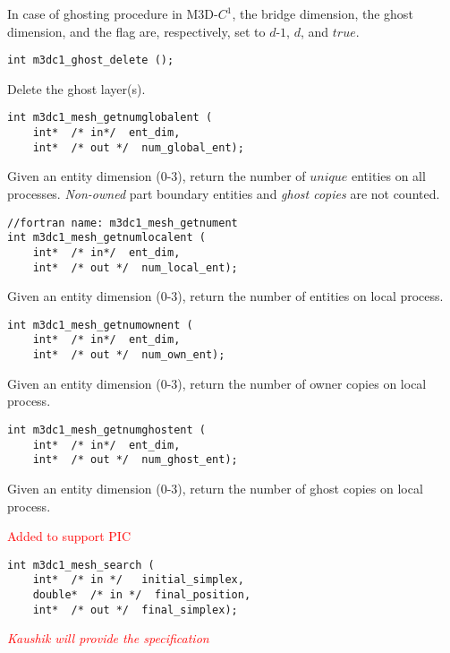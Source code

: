 In case of ghosting procedure in M3D-$C^1$, the bridge dimension, the ghost dimension, and the flag are, respectively, set to $d$-$1$, $d$, and $true$.

\begin{verbatim}
int m3dc1_ghost_delete ();
\end{verbatim}\vspace{-.5cm}\hspace{1cm}
Delete the ghost layer(s).

\begin{verbatim}
int m3dc1_mesh_getnumglobalent (
    int*  /* in*/  ent_dim, 
    int*  /* out */  num_global_ent);
\end{verbatim}\vspace{-.5cm}\hspace{1cm}
Given an entity dimension (0-3), return the number of $unique$ entities on all processes. \textit{Non-owned} part boundary entities and \textit{ghost copies} are not counted.

\begin{verbatim}
//fortran name: m3dc1_mesh_getnument
int m3dc1_mesh_getnumlocalent (
    int*  /* in*/  ent_dim, 
    int*  /* out */  num_local_ent);
\end{verbatim}\vspace{-.5cm}\hspace{1cm}
Given an entity dimension (0-3), return the number of entities on local process. 

\begin{verbatim}
int m3dc1_mesh_getnumownent (
    int*  /* in*/  ent_dim, 
    int*  /* out */  num_own_ent);
\end{verbatim}\vspace{-.5cm}\hspace{1cm}
Given an entity dimension (0-3), return the number of owner copies on local process.

\begin{verbatim}
int m3dc1_mesh_getnumghostent (
    int*  /* in*/  ent_dim, 
    int*  /* out */  num_ghost_ent);
\end{verbatim}\vspace{-.5cm}\hspace{1cm}
Given an entity dimension (0-3), return the number of ghost copies on local process.

\textcolor{red}{Added to support PIC}

\begin{verbatim}
int m3dc1_mesh_search (
    int*  /* in */   initial_simplex, 
    double*  /* in */  final_position, 
    int*  /* out */  final_simplex);
\end{verbatim}\vspace{-.5cm}\hspace{1cm}
\textcolor{red}{\textit{Kaushik will provide the specification}}

